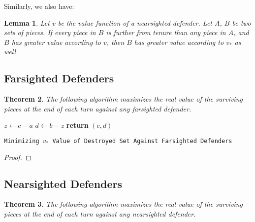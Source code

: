 \documentclass{article}
\theoremstyle{plain}
\newtheorem{thm}{Theorem}[section]
\newtheorem{lem}[thm]{Lemma}
\theoremstyle{definition}
\theoremstyle{remark}
\begin{document}
Similarly, we also have:

\begin{lem}
Let $v$ be the value function of a nearsighted defender. Let $A$, $B$ be two sets of pieces. If every piece in $B$ is further from tenure than any piece in $A$, and $B$ has greater value according to $v$, then $B$ has greater value according to $v_{*}$ as well.
\end{lem}


\subsection{Farsighted Defenders}

\begin{thm}
  The following algorithm maximizes the real value of the surviving pieces at the end of each turn against any farsighted defender.
\end{thm}

\begin{center}
  \begin{minipage}{1\linewidth} %
    \begin{algorithm}[H]
      \medskip
      $z \leftarrow c - a$ \;
      $d \leftarrow b - z$ \;
      {\bf return} $(c,d)$ \;
      \caption{\texttt{Minimizing $v_{*}$ Value of Destroyed Set Against Farsighted Defenders}} %
      \label{alg:farsighted}   %
    \end{algorithm}
  \end{minipage}
\end{center}

\begin{proof}

\end{proof}

\newpage

\subsection{Nearsighted Defenders}

\begin{thm}
  The following algorithm maximizes the real value of the surviving pieces at the end of each turn against any nearsighted defender.
\end{thm}
\end{document}
